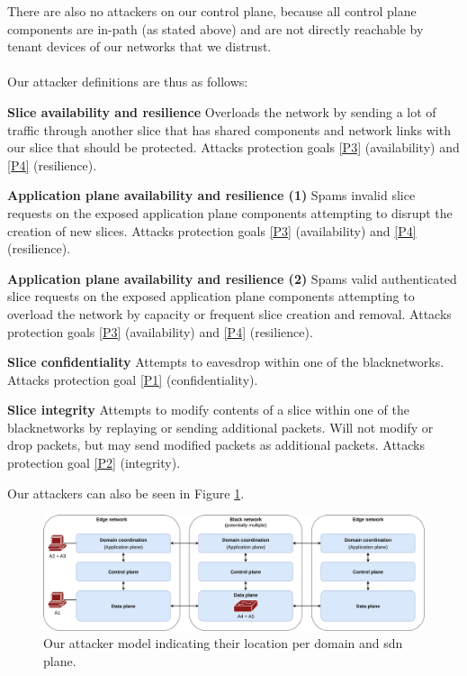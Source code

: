 There are also no attackers on our control plane, because all control plane components are in-path (as stated above) and are not directly reachable by tenant devices of our networks that we distrust.

\paragraph{} Our attacker definitions are thus as follows:
\begin{description}[style=multiline, labelwidth=0.7cm]
    \item[\namedlabel{A1}{A1}] \textbf{Slice availability and resilience} Overloads the network by sending a lot of traffic through another slice that has shared components and network links with our slice that should be protected. Attacks protection goals \ref{P3} (availability) and \ref{P4} (resilience).
    \item[\namedlabel{A2}{A2}] \textbf{Application plane availability and resilience (1)} Spams invalid slice requests on the exposed application plane components attempting to disrupt the creation of new slices. Attacks protection goals \ref{P3} (availability) and \ref{P4} (resilience).
    \item[\namedlabel{A3}{A3}] \textbf{Application plane availability and resilience (2)} Spams valid authenticated slice requests on the exposed application plane components attempting to overload the network by capacity or frequent slice creation and removal. Attacks protection goals \ref{P3} (availability) and \ref{P4} (resilience).
    \item[\namedlabel{A4}{A4}] \textbf{Slice confidentiality} Attempts to eavesdrop within one of the \gls{blacknetwork}s. Attacks protection goal \ref{P1} (confidentiality).
    \item[\namedlabel{A5}{A5}] \textbf{Slice integrity} Attempts to modify contents of a slice within one of the \gls{blacknetwork}s by replaying or sending additional packets. Will not modify or drop packets, but may send modified packets as additional packets. Attacks protection goal \ref{P2} (integrity).
\end{description}

Our attackers can also be seen in Figure \ref{fig:attacker_model}.

    \begin{figure}[h]
        \centering
        \includegraphics[width=\linewidth]{images/chapter_4/attacker_model.png}
        \caption[Attacker model]{Our attacker model indicating their location per domain and \acrshort{sdn} plane.}
        \label{fig:attacker_model}
    \end{figure}
